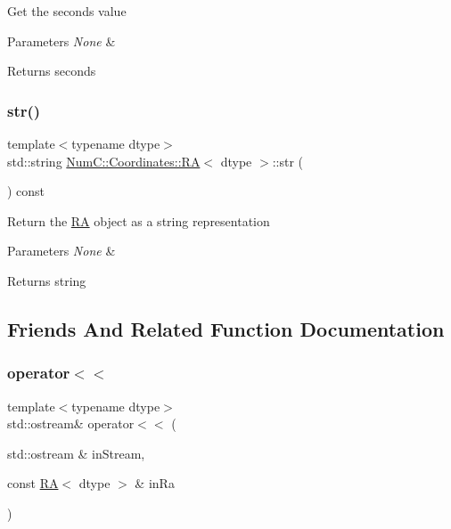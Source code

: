 Get the seconds value


\begin{DoxyParams}{Parameters}
{\em None} & \\
\hline
\end{DoxyParams}
\begin{DoxyReturn}{Returns}
seconds 
\end{DoxyReturn}
\mbox{\label{class_num_c_1_1_coordinates_1_1_r_a_a425ed55481f1bfc3e4dc68f4585b14ca}} 
\subsubsection{\texorpdfstring{str()}{str()}}
{\footnotesize\ttfamily template$<$typename dtype$>$ \\
std\+::string \mbox{\hyperlink{class_num_c_1_1_coordinates_1_1_r_a}{Num\+C\+::\+Coordinates\+::\+RA}}$<$ dtype $>$\+::str (\begin{DoxyParamCaption}{ }\end{DoxyParamCaption}) const\hspace{0.3cm}{\ttfamily [inline]}}

Return the \mbox{\hyperlink{class_num_c_1_1_coordinates_1_1_r_a}{RA}} object as a string representation


\begin{DoxyParams}{Parameters}
{\em None} & \\
\hline
\end{DoxyParams}
\begin{DoxyReturn}{Returns}
string 
\end{DoxyReturn}


\subsection{Friends And Related Function Documentation}
\mbox{\label{class_num_c_1_1_coordinates_1_1_r_a_acba639d6020d3614a9cf1d47587c30fa}} 
\subsubsection{\texorpdfstring{operator$<$$<$}{operator<<}}
{\footnotesize\ttfamily template$<$typename dtype$>$ \\
std\+::ostream\& operator$<$$<$ (\begin{DoxyParamCaption}\item[{std\+::ostream \&}]{in\+Stream,  }\item[{const \mbox{\hyperlink{class_num_c_1_1_coordinates_1_1_r_a}{RA}}$<$ dtype $>$ \&}]{in\+Ra }\end{DoxyParamCaption})\hspace{0.3cm}{\ttfamily [friend]}}

